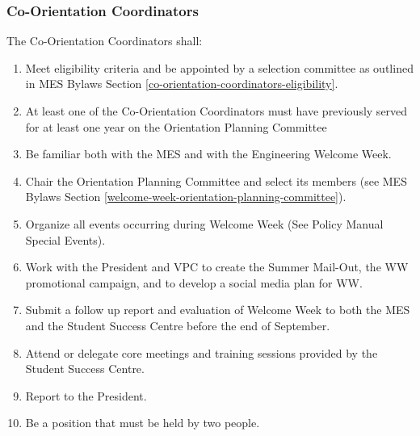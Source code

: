 \subsubsection{Co-Orientation Coordinators}
\label{co-orientation-coordinators}
The Co-Orientation Coordinators shall:

\begin{enumerate}
 \item
  Meet eligibility criteria and be appointed by a selection committee as outlined in MES Bylaws Section \ref{co-orientation-coordinators-eligibility}.
 \item
  At least one of the Co-Orientation Coordinators must have previously served for at least one year on the Orientation Planning Committee
 \item
  Be familiar both with the MES and with the Engineering Welcome Week.
 \item
  Chair the Orientation Planning Committee and select its members (see MES Bylaws Section \ref{welcome-week-orientation-planning-committee}).
 \item
  Organize all events occurring during Welcome Week (See Policy Manual Special Events). %
 \item
  Work with the President and VPC to create the Summer Mail-Out, the WW promotional campaign, and to develop a social media plan for WW.
 \item
  Submit a follow up report and evaluation of Welcome Week to both the MES and the Student Success Centre before the end of September.
 \item
  Attend or delegate core meetings and training sessions provided by the Student Success Centre.
 \item
  Report to the President.
 \item
  Be a position that must be held by two people.
\end{enumerate}